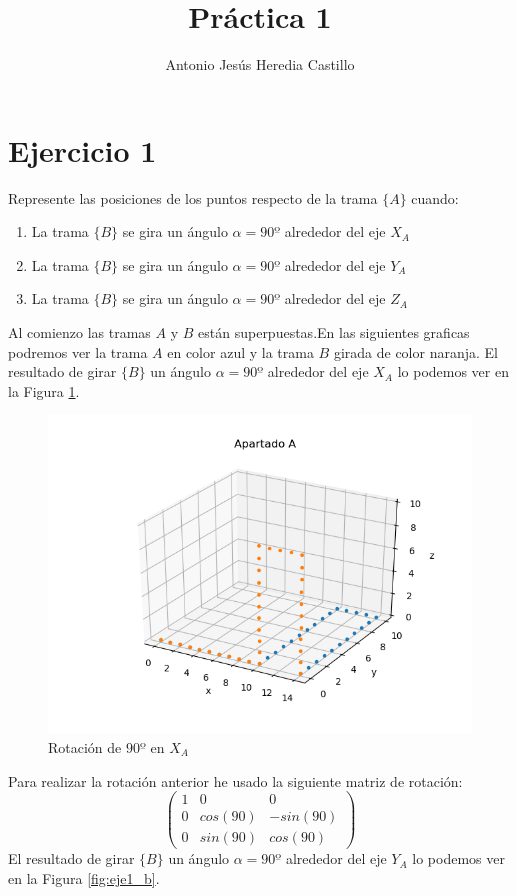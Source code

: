 \documentclass[12pt,a4paper]{report}
\title{Práctica 1}
\author{Antonio Jesús Heredia Castillo}
\begin{document}
\maketitle

\section*{Ejercicio 1}
Represente las posiciones de los puntos respecto de la trama $\{A\}$ cuando:
\begin{enumerate}
	\item La trama $\{B\}$ se gira un ángulo $\alpha=90º$ alrededor del eje $X_A$
	\item La trama $\{B\}$ se gira un ángulo $\alpha=90º$ alrededor del eje $Y_A$
	\item La trama $\{B\}$ se gira un ángulo $\alpha=90º$ alrededor del eje $Z_A$
\end{enumerate}
Al comienzo las tramas $A$ y $B$ están superpuestas.En las siguientes graficas podremos ver la trama $A$ en color azul y la trama $B$ girada de color naranja. El resultado de girar $\{B\}$ un ángulo $\alpha=90º$ alrededor del eje $X_A$ lo podemos ver en la Figura \ref{fig:eje1_a}.
\begin{figure}[H]
	\centering
	\includegraphics[width=0.7\linewidth]{img/eje1_a.png}
	\caption{Rotación de $90º$ en $X_A$}
	\label{fig:eje1_a}
\end{figure}
Para realizar la rotación anterior he usado la siguiente matriz de rotación:
$$
\begin{pmatrix}
		1 & 0 & 0 \\ 
		0 & cos(90) & -sin(90) \\ 
		0 & sin(90) & cos(90) 
\end{pmatrix}
$$
El resultado de girar $\{B\}$ un ángulo $\alpha=90º$ alrededor del eje $Y_A$ lo podemos ver en la Figura \ref{fig:eje1_b}.
\end{document}
